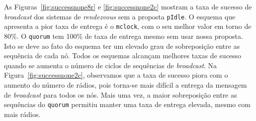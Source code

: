 {%






As Figuras~\ref{fig:successnone8r} e \ref{fig:successnone2c} mostram a taxa de sucesso de {\it broadcast} dos sistemas de {\it rendezvous} sem a proposta {\tt pIdle}. O esquema que apresenta a pior taxa de entrega é o {\tt mclock}, com o seu melhor valor em torno de 80\%. O {\tt quorum} tem 100\% de taxa de entrega mesmo sem usar nossa proposta. Isto se deve ao fato do esquema ter um elevado grau de sobreposição entre as sequência de cada nó. Todos os esquemas alcançam melhores taxas de sucesso quando se aumenta o número de ciclos de sequências de {\it broadcast}. Na Figura~\ref{fig:successnone2c}, observamos que a taxa de sucesso piora com o aumento do número de rádios, pois torna-se mais difícil a entrega da mensagem de {\it broadcast} para todos os nós. Mais uma vez, a maior sobreposição entre as sequências do {\tt quorum} permitiu manter uma taxa de entrega elevada, mesmo com mais rádios.


}
